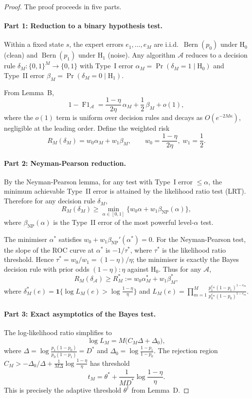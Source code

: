 \begin{proof}
  The proof proceeds in five parts.

  \paragraph{Part 1: Reduction to a binary hypothesis test.}
  Within a fixed state $s$, the expert errors $e_1,\dots,e_M$ are i.i.d.\
  $\operatorname{Bern}(p_0)$ under $\mathrm{H}_0$ (clean) and
  $\operatorname{Bern}(p_1)$ under $\mathrm{H}_1$ (noise).  Any algorithm
  $\mathcal{A}$ reduces to a decision rule
  $\delta_M:\{0,1\}^M\to\{0,1\}$ with Type~I error
  $\alpha_M=\Pr(\delta_M=1\mid\mathrm{H}_0)$ and Type~II error
  $\beta_M=\Pr(\delta_M=0\mid\mathrm{H}_1)$.

  From Lemma~B,
  \[
  1-\operatorname{F1}_{\mathcal{A}}
  = \frac{1-\eta}{2\eta}\,\alpha_M + \frac12\,\beta_M + o(1),
  \]
  where the $o(1)$ term is uniform over decision rules and decays as
  $O(e^{-2M\kappa})$, negligible at the leading order.  Define the
  weighted risk
  \[
  R_M(\delta_M) = w_0\alpha_M + w_1\beta_M,\qquad
  w_0=\frac{1-\eta}{2\eta},\; w_1=\frac12.
  \]

  \paragraph{Part 2: Neyman-Pearson reduction.}
  By the Neyman-Pearson lemma, for any test with Type~I error $\le\alpha$,
  the minimum achievable Type~II error is attained by the likelihood ratio
  test (LRT).  Therefore for any decision rule $\delta_M$,
  \[
  R_M(\delta_M) \ge \min_{\alpha\in[0,1]}
    \bigl\{w_0\alpha + w_1\beta_{\text{NP}}(\alpha)\bigr\},
  \]
  where $\beta_{\text{NP}}(\alpha)$ is the Type~II error of the most powerful
  level-$\alpha$ test.

  The minimiser $\alpha^*$ satisfies $w_0 + w_1\beta_{\text{NP}}'(\alpha^*)=0$.
  For the Neyman-Pearson test, the slope of the ROC curve at $\alpha^*$ is
  $-1/\tau^*$, where $\tau^*$ is the likelihood ratio threshold.  Hence
  $\tau^* = w_0/w_1 = (1-\eta)/\eta$; the minimiser is exactly the Bayes
  decision rule with prior odds $(1-\eta):\eta$ against $\mathrm{H}_0$.  Thus
  for any $\mathcal{A}$,
  \[
  R_M(\delta_{\mathcal{A}})
  \ge R_M^* := w_0\alpha_M^* + w_1\beta_M^*,
  \]
  where $\delta_M^*(e)=\mathbf{1}\{\log L_M(e) > \log\frac{1-\eta}{\eta}\}$
  and $L_M(e)=\prod_{m=1}^M\frac{p_1^{e_m}(1-p_1)^{1-e_m}}{p_0^{e_m}(1-p_0)^{1-e_m}}$.

  \paragraph{Part 3: Exact asymptotics of the Bayes test.}
  The log-likelihood ratio simplifies to
  \[
  \log L_M = M\bigl(C_M\Delta + \Delta_0\bigr),
  \]
  where
  $\Delta=\log\frac{p_1(1-p_0)}{p_0(1-p_1)} = D^*$ and
  $\Delta_0=\log\frac{1-p_1}{1-p_0}$.
  The rejection region $C_M > -\Delta_0/\Delta + \frac1{M\Delta}\log\frac{1-\eta}{\eta}$
  has threshold
  \[
  t_M = \theta^* + \frac1{M D^*}\log\frac{1-\eta}{\eta}.
  \]
  This is precisely the adaptive threshold $\theta^\dagger$ from Lemma~D.


\end{proof}
